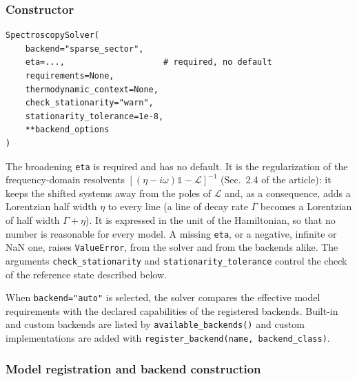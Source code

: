 \documentclass[11pt]{article}
\newcommand{\ArtSecResolvent}{2.4}     %
\begin{document}
\subsubsection{Constructor}

\begin{verbatim}
SpectroscopySolver(
    backend="sparse_sector",
    eta=...,                    # required, no default
    requirements=None,
    thermodynamic_context=None,
    check_stationarity="warn",
    stationarity_tolerance=1e-8,
    **backend_options
)
\end{verbatim}
The broadening \texttt{eta} is required and has no default. It is the regularization of the frequency-domain resolvents $[(\eta-i\omega)\mathbb{1}-\mathcal{L}]^{-1}$ (Sec.~\ArtSecResolvent{} of the article): it keeps the shifted systems away from the poles of $\mathcal{L}$ and, as a consequence, adds a Lorentzian half width $\eta$ to every line (a line of decay rate $\Gamma$ becomes a Lorentzian of half width $\Gamma+\eta$). It is expressed in the unit of the Hamiltonian, so that no number is reasonable for every model. A missing \texttt{eta}, or a negative, infinite or NaN one, raises \texttt{ValueError}, from the solver and from the backends alike. The arguments \texttt{check\_stationarity} and \texttt{stationarity\_tolerance} control the check of the reference state described below.

When \texttt{backend="auto"} is selected, the solver compares the effective model requirements with the declared capabilities of the registered backends. Built-in and custom backends are listed by \texttt{available\_backends()} and custom implementations are added with \texttt{register\_backend(name, backend\_class)}.


\subsubsection{Model registration and backend construction}
\end{document}
